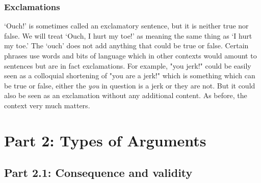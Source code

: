 \subsection{Exclamations} `Ouch!' is sometimes called an exclamatory sentence, but it is neither true nor false. We will treat `Ouch, I hurt my toe!' as meaning the same thing as `I hurt my toe.' The `ouch' does not add anything that could be true or false. Certain phrases use words and bits of language which in other contexts would amount to sentences but are in fact exclamations. For example, "you jerk!" could be easily seen as a colloquial shortening of "you are a jerk!" which is something which can be true or false, either the \emph{you} in question is a jerk or they are not. But it could also be seen as an exclamation without any additional content. As before, the context very much matters. 


\chapter{Part 2: Types of Arguments}
\label{s:Valid}

\section{Part 2.1: Consequence and validity}

